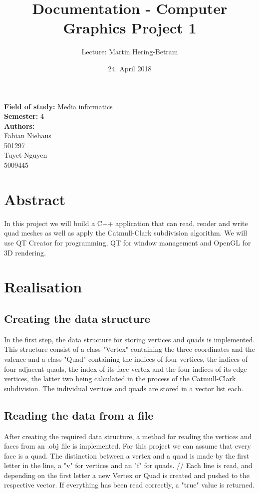 \documentclass[12pt,a4paper]{scrartcl}
\author{Lecture: Martin Hering-Betram}
\title{Documentation - Computer Graphics Project 1}
\date{24. April 2018}
\begin{document}
\maketitle

\begin{center}

\Large
\textbf{Field of study:} Media informatics
\\
\textbf{Semester:} 4
\\[3cm]
\textbf {Authors:}
\\Fabian Niehaus
\\501297
\\Tuyet Nguyen
\\5009445

\end{center}
\newpage
\Large
\tableofcontents
\newpage
\Large
\vspace{3cm}


\section{Abstract}
In this project we will build a C++ application that can read, render and write quad meshes as well as apply the Catmull-Clark subdivision algorithm. We will use QT Creator for programming, QT for window management and OpenGL for 3D rendering.

\section{Realisation}

\subsection{Creating the data structure}
In the first step, the data structure for storing vertices and quads is implemented. This structure consist of a class "Vertex" containing the three coordinates and the valence and a class "Quad" containing the indices of four vertices, the indices of four adjacent quads, the index of its face vertex and the four indices of its edge vertices, the latter two being calculated in the process of the Catmull-Clark subdivision. The individual vertices and quads are stored in a vector list each.

\subsection{Reading the data from a file}
After creating the required data structure, a method for reading the vertices and faces from an .obj file is implemented. For this project we can assume that every face is a quad. The distinction between a vertex and a quad is made by the first letter in the line, a "v" for vertices and an "f" for quads. //
Each line is read, and depending on the first letter a new Vertex or Quad is created and pushed to the respective vector.
If everything has been read correctly, a "true" value is returned.
\end{document}
